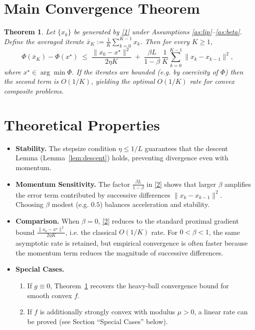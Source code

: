 \documentclass{article}
\newtheorem{theorem}{Theorem}
\begin{document}
\section*{Main Convergence Theorem}
\begin{theorem}\label{thm:rate}
Let $\{x_{k}\}$ be generated by \eqref{1} under Assumptions \ref{as:lip}–\ref{as:beta}.  
Define the averaged iterate $\bar x_{K}:=\frac{1}{K}\sum_{k=0}^{K-1}x_{k}$.  
Then for every $K\ge1$,
\[
\Phi(\bar x_{K})-\Phi(x^{\star})
\;\le\;
\frac{\|x_{0}-x^{\star}\|^{2}}{2\eta K}
\;+\;
\frac{\beta L}{1-\beta}\,\frac{1}{K}\sum_{k=0}^{K-1}\|x_{k}-x_{k-1}\|^{2},
\tag{2}
\]
where $x^{\star}\in\arg\min\Phi$.  
If the iterates are bounded (e.g. by coercivity of $\Phi$) then the second term is $O(1/K)$, yielding the optimal $O(1/K)$ rate for convex composite problems.
\end{theorem}

\section*{Theoretical Properties}
\begin{itemize}
\item \textbf{Stability.} The stepsize condition $\eta\le1/L$ guarantees that the descent Lemma (Lemma~\ref{lem:descent}) holds, preventing divergence even with momentum.
\item \textbf{Momentum Sensitivity.} The factor $\frac{\beta L}{1-\beta}$ in \eqref{2} shows that larger $\beta$ amplifies the error term contributed by successive differences $\|x_{k}-x_{k-1}\|^{2}$. Choosing $\beta$ modest (e.g. $0.5$) balances acceleration and stability.
\item \textbf{Comparison.} When $\beta=0$, \eqref{2} reduces to the standard proximal gradient bound $\frac{\|x_{0}-x^{\star}\|^{2}}{2\eta K}$, i.e. the classical $O(1/K)$ rate. For $0<\beta<1$, the same asymptotic rate is retained, but empirical convergence is often faster because the momentum term reduces the magnitude of successive differences.
\item \textbf{Special Cases.}
  \begin{enumerate}
    \item If $g\equiv0$, Theorem~\ref{thm:rate} recovers the heavy‑ball convergence bound for smooth convex $f$.
    \item If $f$ is additionally strongly convex with modulus $\mu>0$, a linear rate can be proved (see Section “Special Cases” below).
  \end{enumerate}
\end{itemize}
\end{document}
